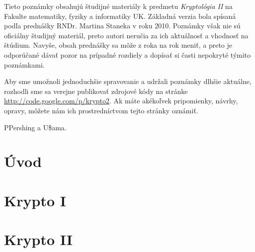 \documentclass[a4paper]{report}
\begin{document}
Tieto poznámky obsahujú študijné materiály k predmetu 
\emph{Kryptológia II}
na Fakulte matematiky, fyziky a informatiky UK.
Základná verzia bola spísaná podľa prednášky RNDr. Martina Staneka v
roku 2010. Poznámky však nie sú oficiálny študijný materiál, preto
autori neručia za ich aktuálnosť a vhodnosť na štúdium. Navyše, obsah
prednášky sa môže z roka na rok meniť, a preto je odporúčané dávať
pozor na prípadné rozdiely a dopísať si časti nepokryté týmito
poznámkami.

Aby sme umožnoli jednoduchšie spravovanie a udržali poznámky dlhšie
aktuálne, rozhodli sme sa verejne publikovať zdrojové kódy na stránke
\url{http://code.google.com/p/krypto2}. Ak máte akékoľvek pripomienky,
návrhy, opravy, môžete nám ich prostredníctvom tejto stránky oznámiť.

PPershing a U\$ama.


\tableofcontents

\chapter{Úvod}
\label{chapter:uvod}



\chapter{Krypto I}
\label{chapter:krypto}






\chapter{Krypto II}
\label{chapter:krypto2}




\listoffigures
\listoftables



\end{document}

